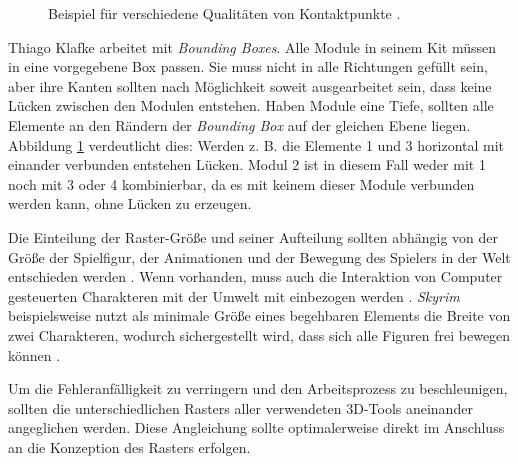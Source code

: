  \begin{figure}[H]
\centering
  \caption{Beispiel für verschiedene Qualitäten von Kontaktpunkte \parencite{Klafke}.}
	\label{boundingBox}
\end{figure}
\vspace{-10.5pt}
Thiago Klafke arbeitet mit \textit{Bounding Boxes}. Alle Module in seinem Kit müssen in eine vorgegebene Box passen. Sie muss nicht in alle Richtungen gefüllt sein, aber ihre Kanten sollten nach Möglichkeit soweit ausgearbeitet sein, dass keine Lücken zwischen den Modulen entstehen. Haben Module eine Tiefe, sollten alle Elemente an den Rändern der \textit{Bounding Box} auf der gleichen Ebene liegen. Abbildung \ref{boundingBox} verdeutlicht dies: Werden z. B. die Elemente 1 und 3 horizontal mit einander verbunden entstehen Lücken. Modul 2 ist in diesem Fall weder mit 1 noch mit 3 oder 4 kombinierbar, da es mit keinem dieser Module verbunden werden kann, ohne Lücken zu erzeugen. \parencite{Klafke}
\par
Die Einteilung der Raster-Größe und seiner Aufteilung sollten abhängig von der Größe der Spielfigur, der Animationen und der Bewegung des Spielers in der Welt entschieden werden \parencite{Perry}. Wenn vorhanden, muss auch die Interaktion von Computer gesteuerten Charakteren mit der Umwelt mit einbezogen werden \parencite{Burgess}. \textit{Skyrim} beispielsweise nutzt als minimale Größe eines begehbaren Elements die Breite von zwei Charakteren, wodurch sichergestellt wird, dass sich alle Figuren frei bewegen können \parencite{Burgess}.
\par
Um die Fehleranfälligkeit zu verringern und den Arbeitsprozess zu beschleunigen, sollten die unterschiedlichen Rasters aller verwendeten 3D-Tools aneinander angeglichen werden. Diese Angleichung sollte optimalerweise direkt im Anschluss an die Konzeption des Rasters erfolgen. \parencite{ForHonor}
\enlargethispage{11.5pt}
\par
